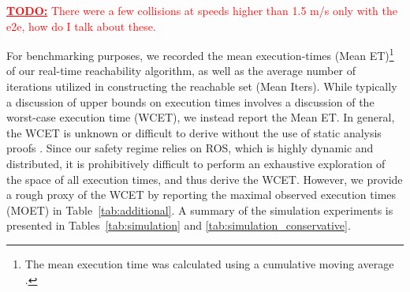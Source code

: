 \documentclass[manuscript,screen,review]{acmart}
\newcommand{\todo}[1]{\textcolor{red}{\textbf{\underline{TODO:}} #1}}
\begin{document}
\todo{There were a few collisions at speeds higher than 1.5 m/s only with the e2e, how do I talk about these.}


For benchmarking purposes, we recorded the mean execution-times (Mean ET)\footnote{The mean execution time was calculated using a cumulative moving average \cite{Jin2019}.} of our real-time reachability algorithm, as well as the average number of iterations utilized in constructing the reachable set (Mean Iters). While typically a discussion of upper bounds on execution times involves a discussion of the worst-case execution time (WCET), we instead report the Mean ET. In general, the WCET is unknown or difficult to derive without the use of static analysis proofs \cite{Reinhard2008}. Since our safety regime relies on ROS, which is highly dynamic and distributed, it is prohibitively difficult to perform an exhaustive exploration of the space of all execution times, and thus derive the WCET.  However, we provide a rough proxy of the WCET by reporting the maximal observed execution times (MOET)  \cite{Reinhard2008} in Table~\ref{tab:additional}. %
A summary of the simulation experiments is presented in Tables~\ref{tab:simulation} and \ref{tab:simulation_conservative}.
\end{document}
